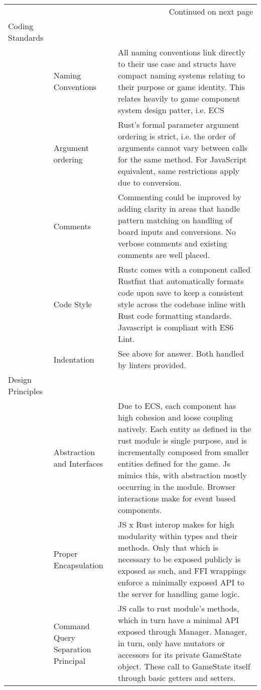 \documentclass[11pt]{article}
\begin{document}
\begin{longtable}{|m{2.0cm}|m{3.0cm}|m{8.0cm}|}
\hline
\endhead
\hline\multicolumn{3}{r}{Continued on next page} \\
\endfoot
\endlastfoot
\hline
Coding Standards &  & \\
\hline
 & Naming \newline Conventions & All naming conventions link directly to their use case and structs have compact naming systems relating to their purpose or game identity. This relates heavily to game component system design patter, i.e. ECS\\
\hline
 & Argument \newline ordering & Rust's formal parameter argument ordering is strict, i.e. the order of arguments cannot vary between calls for the same method. For JavaScript equivalent, same restrictions apply due to conversion.\\
\hline
 & Comments & Commenting could be improved by adding clarity in areas that handle pattern matching on handling of board inputs and conversions. No verbose comments and existing comments are well placed.\\
\hline
 & Code Style & Rustc comes with a component called Rustfmt that automatically formats code upon save to keep a consistent style across the codebase inline with Rust code formatting standards. Javascript is compliant with ES6 Lint.\\
\hline
 & Indentation & See above for answer. Both handled by linters provided.\\
\hline
Design Principles &  & \\
\hline
 & Abstraction \newline and Interfaces & Due to ECS, each component has high cohesion and loose coupling natively. Each entity as defined in the rust module is single purpose, and is incrementally composed from smaller entities defined for the game. Js mimics this, with abstraction mostly occurring in the module. Browser interactions make for event based components.\\
\hline
 & Proper \newline Encapsulation & JS x Rust interop makes for high modularity within types and their methods. Only that which is necessary to be exposed publicly is exposed as such, and FFI wrappings enforce a minimally exposed API to the server for handling game logic.\\
\hline
 & Command Query \newline Separation Principal & JS calls to rust module's methods, which in turn have a minimal API exposed through Manager. Manager, in turn, only have mutators or accessors for its private GameState object. These call to GameState itself through basic getters and setters.\\

\end{longtable}
\end{document}

